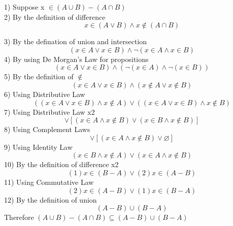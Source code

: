 \documentclass[a4paper,12pt]{article}
\begin{document}
\begin{tcolorbox}
1)
Suppose  x $\in  (A \cup B) - (A \cap B)$ \\

2) By the definition of difference
\begin{displaymath}
 x \in (A \vee B) \wedge x \not\in (A \cap B)
\end{displaymath}

3) By the defination of union and intersection
\begin{displaymath}
 (x \in A \vee  x \in B) \wedge \neg(x \in A \wedge x\in B)
\end{displaymath}
4) By using De Morgan's Law for propositions
\begin{displaymath}
(x \in A \vee  x \in B) \wedge (\neg (x \in A) \wedge \neg(x\in B))
\end{displaymath}
5) By the definition of $\not\in$
\begin{displaymath}
(x \in A \vee  x \in B) \wedge ( x \not\in A \vee x \not\in B)
\end{displaymath}
6) Using Distributive Law 
\begin{displaymath}
((x \in A \vee  x \in B) \wedge x\not\in A) \vee ((x \in A \vee  x \in B) \wedge x\not\in B)
\end{displaymath}
7) Using Distributive Law x2
\begin{displaymath}
[(x \in A \wedge x \not\in A) \vee (x \in B \wedge x \not\in A)] \vee [(x \in A \wedge x \not\in B) \vee (x \in B \wedge x \not\in B)]
\end{displaymath}
8) Using Complement Laws
\begin{displaymath}
[\varnothing \vee (x \in B \wedge x \not\in A)] \vee [(x \in A \wedge x \not\in B) \vee \varnothing]
\end{displaymath}
9) Using Identity Law
\begin{displaymath}
 (x \in B \wedge x \not\in A) \vee (x \in A \wedge x \not\in B)
\end{displaymath}
10) By the definition of difference x2
\begin{displaymath}
(1)x\in(B-A) \vee (2)x \in (A-B)
\end{displaymath}
11) Using Commutative Law
\begin{displaymath}
(2)x \in (A-B) \vee  (1)x\in(B-A)
\end{displaymath}
12) By the definition of union
\begin{displaymath}
(A - B) \cup (B - A)
\end{displaymath}
Therefore $(A \cup B) - (A \cap B) \subseteq (A - B) \cup (B - A)$
\end{tcolorbox}
\end{document}
